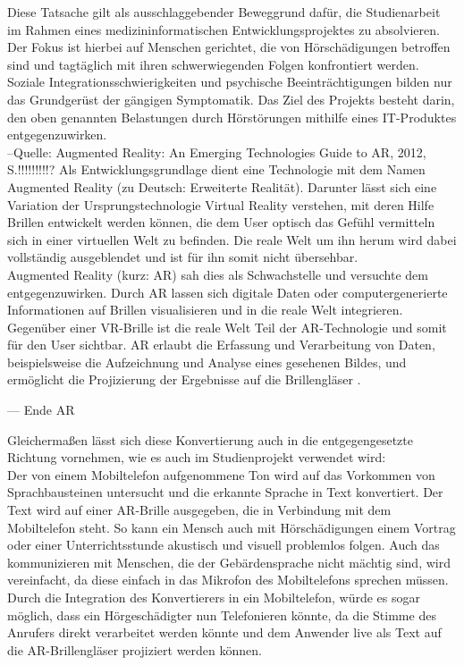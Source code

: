 Diese Tatsache gilt als ausschlaggebender Beweggrund dafür, die Studienarbeit im Rahmen eines medizininformatischen Entwicklungsprojektes zu absolvieren. Der Fokus ist hierbei auf Menschen gerichtet, die von Hörschädigungen betroffen sind und tagtäglich mit ihren schwerwiegenden Folgen konfrontiert werden. Soziale Integrationsschwierigkeiten und psychische Beeinträchtigungen bilden nur das Grundgerüst der gängigen Symptomatik. 
Das Ziel des Projekts besteht darin, den oben genannten Belastungen durch Hörstörungen mithilfe eines IT-Produktes entgegenzuwirken.\\

--Quelle: Augmented Reality: An Emerging Technologies Guide to AR, 2012, S.!!!!!!!!!?
Als Entwicklungsgrundlage dient eine Technologie mit dem Namen Augmented Reality (zu Deutsch: Erweiterte Realität). Darunter lässt sich eine Variation der Ursprungstechnologie Virtual Reality verstehen, mit deren Hilfe Brillen entwickelt werden können, die dem User optisch das Gefühl vermitteln sich in einer virtuellen Welt zu befinden. Die reale Welt um ihn herum wird dabei vollständig ausgeblendet und ist für ihn somit nicht übersehbar.\\
Augmented Reality (kurz: AR) sah dies als Schwachstelle und versuchte dem entgegenzuwirken. 
Durch AR lassen sich digitale Daten oder computergenerierte Informationen auf Brillen visualisieren und in die reale Welt integrieren. Gegenüber einer VR-Brille ist die reale Welt Teil der AR-Technologie und somit für den User sichtbar. AR erlaubt die Erfassung und Verarbeitung von Daten, beispielsweise die Aufzeichnung und Analyse eines gesehenen Bildes, und ermöglicht die Projizierung der Ergebnisse auf die Brillengläser \cite{kipper_augmented_2012}.\par
--- Ende AR

Gleichermaßen lässt sich diese Konvertierung auch in die entgegengesetzte Richtung vornehmen, wie es auch im Studienprojekt verwendet wird:\\ 

Der von einem Mobiltelefon aufgenommene Ton wird auf das Vorkommen von Sprachbausteinen untersucht und die erkannte Sprache in Text konvertiert. 
Der Text wird auf einer AR-Brille ausgegeben, die in Verbindung mit dem Mobiltelefon steht.
So kann ein Mensch auch mit Hörschädigungen einem Vortrag oder einer Unterrichtsstunde akustisch und visuell problemlos folgen.
Auch das kommunizieren mit Menschen, die der Gebärdensprache nicht mächtig sind, wird vereinfacht, da diese einfach in das Mikrofon des Mobiltelefons sprechen müssen. 
Durch die Integration des Konvertierers in ein Mobiltelefon, würde es sogar möglich, dass ein Hörgeschädigter nun Telefonieren könnte, da die Stimme des Anrufers direkt verarbeitet werden könnte und dem Anwender live als Text auf die AR-Brillengläser projiziert werden können.

